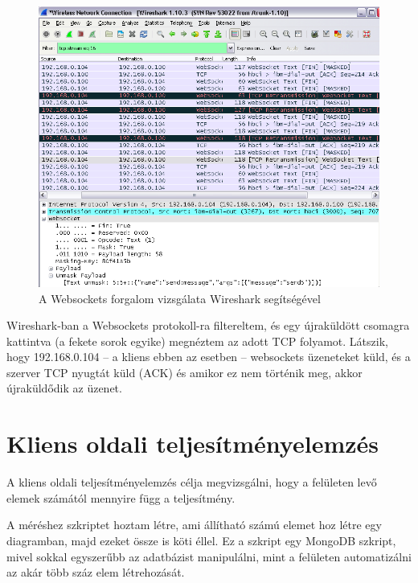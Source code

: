 \begin{figure}[!ht]
\centering
\includegraphics[width=15cm,keepaspectratio]{figures/wireshark.png}
\caption{A Websockets forgalom vizsgálata Wireshark segítségével}
\label{fig:wireshark}
\end{figure}


Wireshark-ban a Websockets protokoll-ra filtereltem, és egy újraküldött csomagra kattintva (a fekete sorok egyike) megnéztem az adott TCP folyamot. Látszik, hogy 192.168.0.104 -- a kliens ebben az esetben -- websockets üzeneteket küld, és a szerver TCP nyugtát küld (ACK) és amikor ez nem történik meg, akkor újraküldődik az üzenet.






\section{Kliens oldali teljesítményelemzés}
 
A kliens oldali teljesítményelemzés célja megvizsgálni, hogy a felületen levő elemek számától mennyire függ a teljesítmény. 

A méréshez szkriptet hoztam létre, ami állítható számú elemet hoz létre egy diagramban, majd ezeket össze is köti éllel. Ez a szkript egy MongoDB szkript, mivel sokkal egyszerűbb az adatbázist manipulálni, mint a felületen automatizálni az akár több száz elem létrehozását. 


